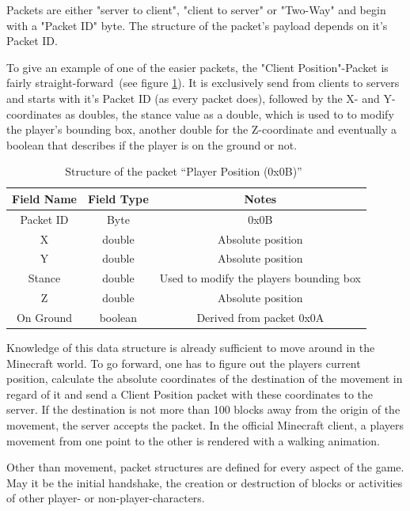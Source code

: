 
Packets are either "server to client", "client to server" or "Two-Way" and begin with a "Packet ID" byte. The structure of the packet's payload depends on it's Packet ID.
 
To give an example of one of the easier packets, the "Client Position"-Packet is fairly straight-forward~(see figure \ref{mc_packet}). It is exclusively send from clients to servers and starts with it's Packet ID (as every packet does), followed by the X- and Y-coordinates as doubles, the stance value as a double, which is used to to modify the player's bounding box, another double for the Z-coordinate and eventually a boolean that describes if the player is on the ground or not.~\cite{protocol}

\begin{table}[htb]
\centering
\begin{tabular}{|c|c|c|}\hline

    Field Name & Field Type & Notes \\ \hline
   Packet ID & Byte & 0x0B \\ \hline
   X & double & Absolute position \\ \hline
   Y & double & Absolute position \\ \hline
   Stance & double & Used to modify the players bounding box \\ \hline
   Z & double & Absolute position \\ \hline
   On Ground & boolean & Derived from packet 0x0A \\ \hline
   
\end{tabular}
\caption{Structure of the packet ``Player Position (0x0B)''~\cite{protocol}}
\label{mc_packet}
\end{table}

Knowledge of this data structure is already sufficient to move around in the Minecraft world. To go forward, one has to figure out the players current position, calculate the absolute coordinates of the destination of the movement in regard of it and send a Client Position packet with these coordinates to the server. If the destination is not more than 100 blocks away from the origin of the movement, the server accepts the packet. In the official Minecraft client, a players movement from one point to the other is rendered with a walking animation.

Other than movement, packet structures are defined for every aspect of the game. May it be the initial handshake, the creation or destruction of blocks or activities of other player- or non-player-characters.

